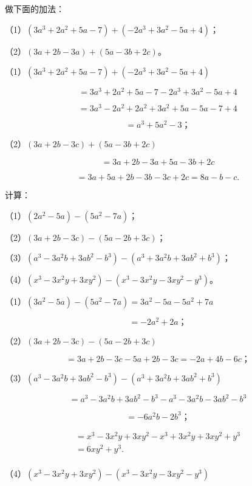  做下面的加法：

（1）\((3a^{3} + 2a^{2} + 5a - 7) + (-2a^{3} + 3a^{2} - 5a + 4)\)；

（2）\((3a + 2b - 3a) + (5a - 3b + 2c)\)。

（1）\((3a^{3} + 2a^{2} + 5a - 7) + (-2a^{3} + 3a^{2} - 5a + 4)\)

\[
= 3 a ^{3} + 2 a ^{2} + 5 a - 7 - 2 a ^{3} + 3 a ^{2} - 5 a + 4
\]

\[
= 3 a ^{3} - 2 a ^{2} + 2 a ^{2} + 3 a ^{2} + 5 a - 5 a - 7 + 4
\]

\[
= a ^{3} + 5 a ^{2} - 3\text{；}
\]

（2）\((3a + 2b - 3c) + (5a - 3b + 2c)\)

\[
= 3 a + 2 b - 3 a + 5 a - 3 b + 2 c
\]

\[
= 3 a + 5 a + 2 b - 3 b - 3 c + 2 c = 8 a - b - c.
\]

 计算：

（1）\((2a^{2} - 5a) - (5a^{2} - 7a)\)；

（2）\((3a + 2b - 3c) - (5a - 2b + 3c)\)；

（3）\((a^{3} - 3a^{2}b + 3ab^{2} - b^{3}) - (a^{3} + 3a^{2}b + 3ab^{2} + b^{3})\)；

（4）\((x^{3} - 3x^{2}y + 3xy^{2}) - (x^{3} - 3x^{2}y - 3xy^{2} - y^{3})\)。

（1）\((3a^{2} - 5a) - (5a^{2} - 7a) = 3a^{2} - 5a - 5a^{2} + 7a\)

\[
= - 2 a ^{2} + 2 a\text{；}
\]

（2）\((3a + 2b - 3c) - (5a - 2b + 3c)\)

\[
= 3 a + 2 b - 3 c - 5 a + 2 b - 3 c = - 2 a + 4 b - 6 c\text{；}
\]

（3）\((a^{3} - 3a^{2}b + 3ab^{2} - b^{3}) - (a^{3} + 3a^{2}b + 3ab^{2} + b^{3})\)

\[
= a ^{3} - 3 a ^{2} b + 3 a b ^{2} - b ^{3} - a ^{3} - 3 a ^{2} b - 3 a b ^{2} - b ^{3}
\]

\[
= - 6 a ^{2} b - 2 b ^{3}\text{；}
\]

\[
\begin{array}{l} = x ^{3} - 3 x ^{2} y + 3 x y ^{2} - x ^{3} + 3 x ^{2} y + 3 x y ^{2} + y ^{3} \\ = 6 x y ^{2} + y ^{3}. \\ \end{array}
\]

（4）\((x^{3} - 3x^{2}y + 3xy^{2}) - (x^{3} - 3x^{2}y - 3xy^{2} - y^{3})\)

